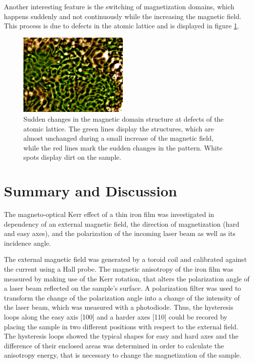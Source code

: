 \documentclass[a4paper]{scrartcl}
\numberwithin{equation}{section}
\numberwithin{figure}{section}
\numberwithin{table}{section}
\begin{document}
Another interesting feature is the switching of magnetization domains, which happens suddenly and not continuously while the increasing the magnetic field. This process is due to defects in the atomic lattice and is displayed in figure \ref{fig:defect}.
\begin{figure}
    \includegraphics[width=0.48\textwidth]{img/kontrast.pdf}
  \caption{ \small Sudden changes in the magnetic domain structure at defects of the atomic lattice. The green lines display the structures, which are almost unchanged during a small increase of the magnetic field, while the red lines mark the sudden changes in the pattern. White spots display dirt on the sample. }
  	\label{fig:defect}
\end{figure}



\section{Summary and Discussion}
The magneto-optical Kerr effect of a thin iron film was investigated in dependency of an external magnetic field, the direction of magnetization (hard and easy axes), and the polarization of the incoming laser beam as well as its incidence angle. 

The external magnetic field was generated by a toroid coil and calibrated against the current using a Hall probe. The magnetic anisotropy of the iron film was measured by making use of the Kerr rotation, that alters the polarization angle of a laser beam reflected on the sample's surface. A polarization filter was used to transform the change of the polarization angle into a change of the intensity of the laser beam, which was measured with a photodiode. Thus, the hysteresis loops along the easy axis [100] and a harder axes [110] could be recored by placing the sample in two different positions with respect to the external field. The hysteresis loops showed the typical shapes for easy and hard axes and the difference of their enclosed areas was determined in order to calculate the anisotropy energy, that is necessary to change the magnetization of the sample.
\end{document}
